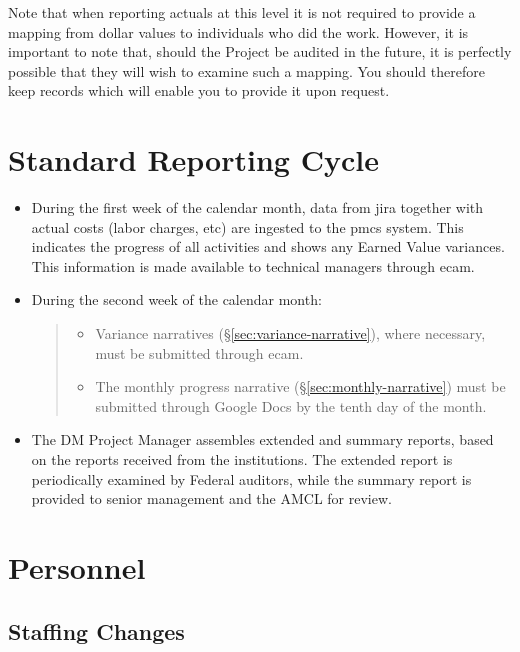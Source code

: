 Note that when reporting actuals at this level it is not required to
provide a mapping from dollar values to individuals who did the work.
However, it is important to note that, should the Project be audited in
the future, it is perfectly possible that they will wish to examine such
a mapping. You should therefore keep records which will enable you to
provide it upon request.

\section{Standard Reporting Cycle}
\label{sec:reporting-cycle}

\begin{itemize}
\item
  During the first week of the calendar month, data from \gls{jira} together with actual costs (labor charges, etc) are ingested to the \gls{pmcs} system.
  This indicates the progress of all activities and shows any Earned Value variances.
  This information is made available to technical managers through \gls{ecam}.
\item
  During the second week of the calendar month:

  \begin{quote}
  \begin{itemize}
  \item
    Variance narratives (\S\ref{sec:variance-narrative}), where necessary, must be submitted through \gls{ecam}.
  \item
    The monthly progress narrative (\S\ref{sec:monthly-narrative}) must be submitted through Google Docs by the tenth day of the month.
  \end{itemize}
  \end{quote}
\item
  The DM Project Manager assembles extended and summary reports, based
  on the reports received from the institutions. The extended report is
  periodically examined by Federal auditors, while the summary report is
  provided to senior management and the AMCL for review.
\end{itemize}

\section{Personnel}

\subsection{Staffing Changes}
\label{sec:staffing}


